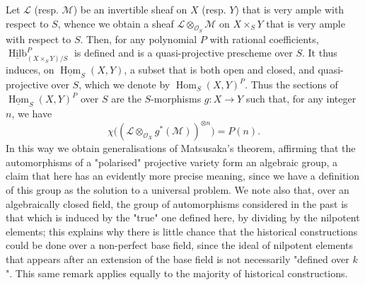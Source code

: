 \begin{enumerate}
    \par{}Let \(\mathscr {L}\) (resp. \(\mathscr {M}\)) be an invertible sheaf on \(X\) (resp. \(Y\)) that is very ample with respect to \(S\), whence we obtain a sheaf \(\mathscr {L}\otimes _{\mathcal {O}_S}\mathscr {M}\) on \(X\times _S Y\) that is very ample with respect to \(S\).
      Then, for any polynomial \(P\) with rational coefficients, \(\underline {\operatorname {Hilb}}_{(X\times _S Y)/S}^P\) is defined and is a quasi-projective prescheme over \(S\).
      It thus induces, on \(\underline {\operatorname {Hom}}_S(X,Y)\), a subset that is both open and closed, and quasi-projective over \(S\), which we denote by \(\operatorname {Hom}_S(X,Y)^P\).
      Thus the sections of \(\underline {\operatorname {Hom}}_S(X,Y)^P\) over \(S\) are the \(S\)-morphisms \(g\colon  X\to  Y\) such that, for any integer \(n\), we have
      \[         \chi \Big ((\mathscr {L}\otimes _{\mathcal {O}_X}g^*(\mathscr {M}))^{\otimes  n}\Big )         = P(n).       \]
      In this way we obtain generalisations of Matsusaka's theorem, affirming that the automorphisms of a "polarised" projective variety form an algebraic group, a claim that here has an evidently more precise meaning, since we have a definition of this group as the solution to a universal problem.
      We note also that, over an algebraically closed field, the group of automorphisms considered in the past is that which is induced by the "true" one defined here, by dividing by the nilpotent elements;
      this explains why there is little chance that the historical constructions could be done over a non-perfect base field, since the ideal of nilpotent elements that appears after an extension of the base field is not necessarily "defined over \(k\)".
      This same remark applies equally to the majority of historical constructions.
  


\end{enumerate}
